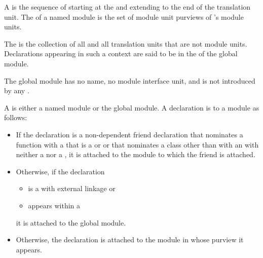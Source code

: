 \pnum
A  is
the sequence of 
starting at the 
and extending to the end of the translation unit.
The 
of a named module  is the set of module unit purviews
of 's module units.

\pnum
The  is the collection of all
and all translation units that are not module units.
Declarations appearing in such a context
are said to be in the  of the global module.
\begin{note}
The global module has no name, no module interface unit, and is not
introduced by any .
\end{note}

\pnum
A  is either a named module or the global module.
A declaration is  to a module as follows:
\begin{itemize}
\item
If the declaration is a non-dependent friend declaration
that nominates a function with a 
that is a  or  or
that nominates a class
other than with an  with neither
a  nor a ,
it is attached to the module to which the friend is attached.
\item Otherwise, if the declaration
\begin{itemize}
\item is a  with external linkage or
\item appears within a 
\end{itemize}
it is attached to the global module.

\item Otherwise, the declaration is
attached to the module in whose purview it appears.
\end{itemize}

